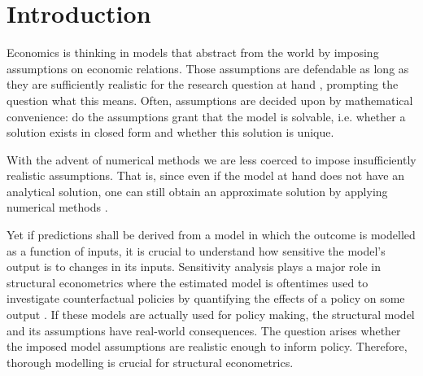 \section{Introduction} \label{intro}


Economics is thinking in models that abstract from the world by imposing assumptions on economic relations. Those assumptions are defendable as long as they are sufficiently realistic for the research question at hand \citep{F53}, prompting the question what this means. Often, assumptions are decided upon by mathematical convenience: do the assumptions grant that the model is solvable, i.e. whether a solution exists in closed form and whether this solution is unique.



With the advent of numerical methods we are less coerced to impose insufficiently realistic assumptions. That is, since even if the model at hand does not have an analytical solution, one can still obtain an approximate solution by applying numerical methods \citep{MF04}.


Yet if predictions shall be derived from a model in which the outcome is modelled as a function of inputs, it is crucial to understand how sensitive the model’s output is to changes in its inputs. Sensitivity analysis plays a major role in structural econometrics where the estimated model is oftentimes used to investigate counterfactual policies by quantifying the effects of a policy on some output \citep{LM17}. If these models are actually used for policy making, the structural model and its assumptions have real-world consequences. The question arises whether the imposed model assumptions are realistic enough to inform policy. Therefore, thorough modelling is crucial for structural econometrics.

